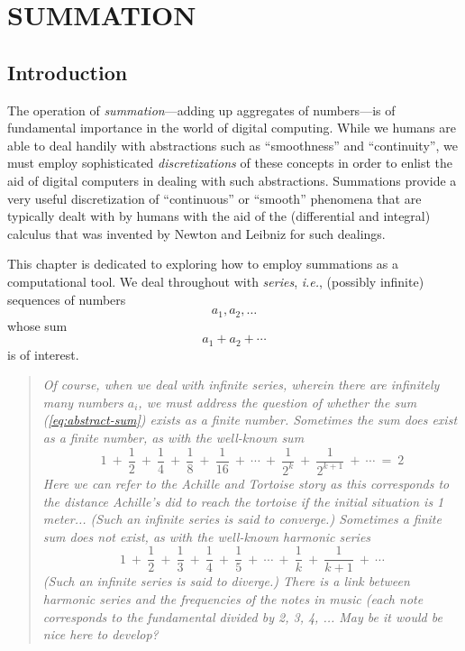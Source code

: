 
\chapter{SUMMATION}
\label{ch:Summation}


\section{Introduction}
\label{sec:intro}

The operation of {\it summation}---adding up aggregates of
numbers---is of fundamental importance in the world of digital
computing.  While we humans are able to deal handily with abstractions
such as ``smoothness'' and ``continuity'', we must employ
sophisticated {\em discretizations} of these concepts in order to
enlist the aid of digital computers in dealing with such abstractions.
Summations provide a very useful discretization of ``continuous'' or
``smooth'' phenomena that are typically dealt with by humans with the
aid of the (differential and integral) calculus that was invented by
Newton and Leibniz for such dealings.

This chapter is dedicated to exploring how to employ summations as a
computational tool.  We deal throughout with {\it series}, {\it i.e.},
(possibly infinite) sequences of numbers
\[ a_1, a_2, \ldots \]
whose sum
\begin{equation}
\label{eq:abstract-sum}
a_1 + a_2 + \cdots
\end{equation}
is of interest.
\begin{quote}
{\em Of course, when we deal with {\em infinite} series, wherein there
  are infinitely many numbers $a_i$, we must address the question of
  whether the sum (\ref{eq:abstract-sum}) exists as a finite number.
  Sometimes the sum does exist as a finite number, as with the
  well-known sum
\[ 1 \ + \ \frac{1}{2} \ + \ \frac{1}{4} \ + \ \frac{1}{8} \ +
\ \frac{1}{16} \ + \ \cdots \ + \ \frac{1}{2^k}  \ +
\ \frac{1}{2^{k+1}} \ + \ \cdots \ = \ 2 
\]
{\Denis Here we can refer to the Achille and Tortoise story as this corresponds to the distance Achille's did to reach the tortoise if the initial situation is 1 meter...}
(Such an infinite series is said to {\em converge}.)
Sometimes a finite sum does {\em not} exist, as with the well-known
{\it harmonic} series
\[ 1 \ + \ \frac{1}{2} \ + \ \frac{1}{3} \ + \ \frac{1}{4} \ +
\ \frac{1}{5} \ + \ \cdots \ + \ \frac{1}{k}  \ + \ \frac{1}{k+1} \ +
\ \cdots
\]
(Such an infinite series is said to {\em diverge}.)
{\Denis There is a link between harmonic series and the frequencies of the notes in music (each note corresponds to the fundamental divided by 2, 3, 4, ...
May be it would be nice here to develop?}
}
\end{quote}



